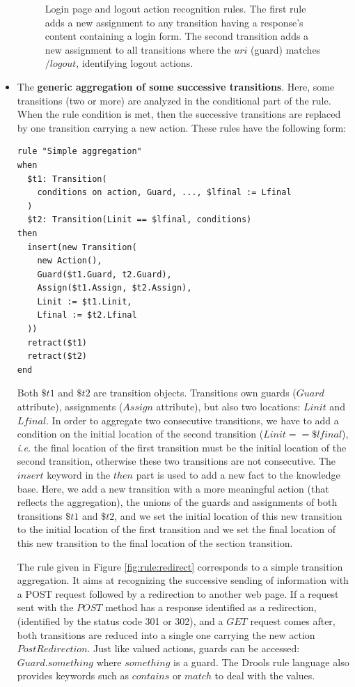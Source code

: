\begin{itemize}
\begin{figure}[h]
    \caption{Login page and logout action recognition rules. The
    first rule adds a new assignment to any transition having a
    response's content containing a login form. The second
    transition adds a new assignment to all transitions where
    the $uri$ (guard) matches $/logout$, identifying logout
    actions.}
    \label{fig:rule:login}
\end{figure}

\item The \textbf{generic aggregation of some successive
    transitions}. Here, some transitions (two or more) are
    analyzed in the conditional part of the rule. When the rule
    condition is met, then the successive transitions are replaced
    by one transition carrying a new action. These rules have the
    following form:

\begin{verbatim}
rule "Simple aggregation"
when
  $t1: Transition(
    conditions on action, Guard, ..., $lfinal := Lfinal
  )
  $t2: Transition(Linit == $lfinal, conditions)
then
  insert(new Transition(
    new Action(),
    Guard($t1.Guard, t2.Guard),
    Assign($t1.Assign, $t2.Assign),
    Linit := $t1.Linit,
    Lfinal := $t2.Lfinal
  ))
  retract($t1)
  retract($t2)
end
\end{verbatim}

Both $\$t1$ and $\$t2$ are transition objects. Transitions own
guards ($Guard$ attribute), assignments ($Assign$ attribute), but
also two locations: $Linit$ and $Lfinal$. In order to aggregate
two consecutive transitions, we have to add a condition on the
initial location of the second transition ($Linit == \$lfinal$),
\emph{i.e.} the final location of the first transition must be the
initial location of the second transition, otherwise these two
transitions are not consecutive. The $insert$ keyword in the
$then$ part is used to add a new fact to the knowledge base.
Here, we add a new transition with a more meaningful action (that
reflects the aggregation), the unions of the guards and
assignments of both transitions $\$t1$ and $\$t2$, and we set the
initial location of this new transition to the initial location
of the first transition and we set the final location of this new
transition to the final location of the section transition.

The rule given in Figure \ref{fig:rule:redirect} corresponds to a
simple transition aggregation. It aims at recognizing the
successive sending of information with a POST request followed by
a redirection to another web page.  If a request sent with the
$POST$ method has a response identified as a redirection,
(identified by the status code 301 or 302), and  a $GET$ request
comes after, both transitions are reduced into a single one
carrying the new action $PostRedirection$. Just like valued
actions, guards can be accessed: $Guard.something$ where
$something$ is a guard. The Drools rule language also provides
keywords such as $contains$ or $match$ to deal with the values.
\end{itemize}


